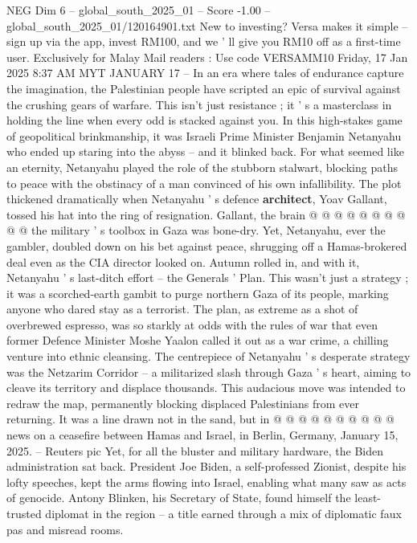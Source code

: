 \begin{textsample}{NEG Dim 6 – global\_south\_2025\_01 – Score -1.00 – global\_south\_2025\_01/120164901.txt}  \label{ex:f6_neg_091}
New to investing?
Versa makes it simple -- sign up via the app, invest RM100, and we ' ll give you RM10 off as a first-time user.
Exclusively for Malay Mail readers : Use code VERSAMM10 Friday, 17 Jan 2025 8:37 AM MYT JANUARY 17 -- In an era where tales of endurance capture the imagination, the Palestinian people have scripted an epic of survival against the crushing gears of warfare.
This isn't just resistance ; it ' s a masterclass in holding the line when every odd is stacked against you.
In this high-stakes game of geopolitical brinkmanship, it was Israeli Prime Minister Benjamin Netanyahu who ended up staring into the abyss -- and it blinked back.
For what seemed like an eternity, Netanyahu played the role of the stubborn stalwart, blocking paths to peace with the obstinacy of a man convinced of his own infallibility.
The plot thickened dramatically when Netanyahu ' s defence \textbf{architect}, Yoav Gallant, tossed his hat into the ring of resignation.
Gallant, the brain @ @ @ @ @ @ @ @ @ @ the military ' s toolbox in Gaza was bone-dry.
Yet, Netanyahu, ever the gambler, doubled down on his bet against peace, shrugging off a Hamas-brokered deal even as the CIA director looked on.
Autumn rolled in, and with it, Netanyahu ' s last-ditch effort -- the Generals ' Plan.
This wasn't just a strategy ; it was a scorched-earth gambit to purge northern Gaza of its people, marking anyone who dared stay as a terrorist.
The plan, as extreme as a shot of overbrewed espresso, was so starkly at odds with the rules of war that even former Defence Minister Moshe Yaalon called it out as a war crime, a chilling venture into ethnic cleansing.
The centrepiece of Netanyahu ' s desperate strategy was the Netzarim Corridor -- a militarized slash through Gaza ' s heart, aiming to cleave its territory and displace thousands.
This audacious move was intended to redraw the map, permanently blocking displaced Palestinians from ever returning.
It was a line drawn not in the sand, but in @ @ @ @ @ @ @ @ @ @ news on a ceasefire between Hamas and Israel, in Berlin, Germany, January 15, 2025. -- Reuters pic Yet, for all the bluster and military hardware, the Biden administration sat back.
President Joe Biden, a self-professed Zionist, despite his lofty speeches, kept the arms flowing into Israel, enabling what many saw as acts of genocide.
Antony Blinken, his Secretary of State, found himself the least-trusted diplomat in the region -- a title earned through a mix of diplomatic faux pas and misread rooms.

\end{textsample}
